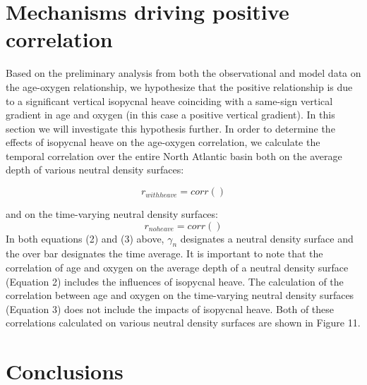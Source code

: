 \section{Mechanisms driving positive correlation}
Based on the preliminary analysis from both the observational and model data on the age-oxygen relationship, we hypothesize that the positive relationship is due to a significant vertical isopycnal heave coinciding with a same-sign vertical gradient in age and oxygen (in this case a positive vertical gradient). In this section we will investigate this hypothesis further.
	In order to determine the effects of isopycnal heave on the age-oxygen correlation, we calculate the temporal correlation over the entire North Atlantic basin both on the average depth of various neutral density surfaces:


$$
r_{with heave} = corr()
$$

and on the time-varying neutral density surfaces:
$$
r_{no heave} = corr()
$$
In both equations (2) and (3) above, $\gamma_n$  designates a neutral density surface and the over bar designates the time average. It is important to note that the correlation of age and oxygen on the average depth of a neutral density surface (Equation 2) includes the influences of isopycnal heave. The calculation of the correlation between age and oxygen on the time-varying neutral density surfaces (Equation 3) does not include the impacts of isopycnal heave. Both of these correlations calculated on various neutral density surfaces are shown in Figure 11.




\section{Conclusions}



%
